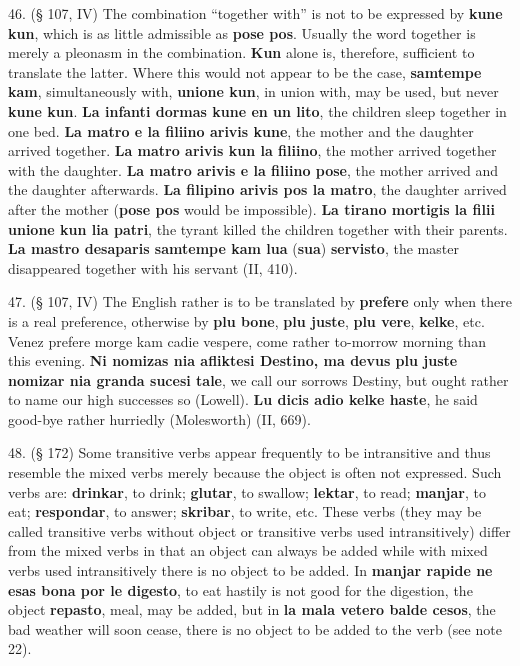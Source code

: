 46. (§ 107, IV) The combination ``together with'' is not to be expressed by \textbf{kune kun}, which is as little admissible as \textbf{pose pos}. Usually the word together is merely a pleonasm in the combination. \textbf{Kun} alone is, therefore, sufficient to translate the latter. Where this would not appear to be the case, \textbf{samtempe kam}, simultaneously with, \textbf{unione kun}, in union with, may be used, but never \textbf{kune kun}. \textbf{La infanti dormas kune en un lito}, the children sleep together in one bed. \textbf{La matro e la filiino arivis kune}, the mother and the daughter arrived together. \textbf{La matro arivis kun la filiino}, the mother arrived together with the daughter. \textbf{La matro arivis e la filiino pose}, the mother arrived and the daughter afterwards. \textbf{La filipino arivis pos la matro}, the daughter arrived after the mother (\textbf{pose pos} would be impossible). \textbf{La tirano mortigis la filii unione kun lia patri}, the tyrant killed the children together with their parents. \textbf{La mastro desaparis samtempe kam lua }(\textbf{sua})\textbf{ servisto}, the master disappeared together with his servant (II, 410). %

47. (§ 107, IV) The English rather is to be translated by \textbf{prefere} only when there is a real preference, otherwise by \textbf{plu bone}, \textbf{plu juste}, \textbf{plu vere}, \textbf{kelke}, etc. Venez prefere morge kam cadie vespere, come rather to-morrow morning than this evening. \textbf{Ni nomizas nia afliktesi Destino, ma devus plu juste nomizar nia granda sucesi tale}, we call our sorrows Destiny, but ought rather to name our high successes so (Lowell). \textbf{Lu dicis adio kelke haste}, he said good-bye rather hurriedly (Molesworth) (II, 669). %

48. (§ 172) Some transitive verbs appear frequently to be intransitive and thus resemble the mixed verbs merely because the object is often not expressed. Such verbs are: \textbf{drinkar}, to drink; \textbf{glutar}, to swallow; \textbf{lektar}, to read; \textbf{manjar}, to eat; \textbf{respondar}, to answer; \textbf{skribar}, to write, etc. These verbs (they may be called transitive verbs without object or transitive verbs used intransitively) differ from the mixed verbs in that an object can always be added while with mixed verbs used intransitively there is no object to be added. In \textbf{manjar rapide ne esas bona por le digesto}, to eat hastily is not good for the digestion, the object \textbf{repasto}, meal, may be added, but in \textbf{la mala vetero balde cesos}, the bad weather will soon cease, there is no object to be added to the verb (see note 22). %

